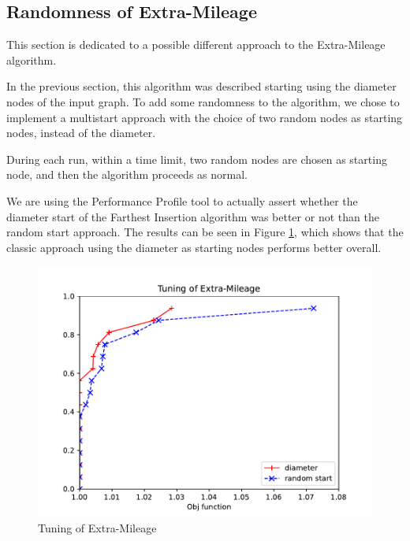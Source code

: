 \subsection{Randomness of Extra-Mileage}
This section is dedicated to a possible different approach to the Extra-Mileage algorithm. 

In the previous section, this algorithm was described starting using the diameter nodes of the input graph. To add some randomness to the algorithm, we chose to implement a multistart approach with the choice of two random nodes as starting nodes, instead of the diameter.

During each run, within a time limit, two random nodes are chosen as starting node, and then the algorithm proceeds as normal. 

We are using the Performance Profile tool to actually assert whether the diameter start of the Farthest Insertion algorithm was better or not than the random start approach. The results can be seen in Figure \ref{fig:extra}, which shows that the classic approach using the diameter as starting nodes performs better overall.

\begin{figure}[!h]
    \centering
    \includegraphics[width=\textwidth]{images/extra.pdf}
    \caption{Tuning of Extra-Mileage}
    \label{fig:extra}
\end{figure}
